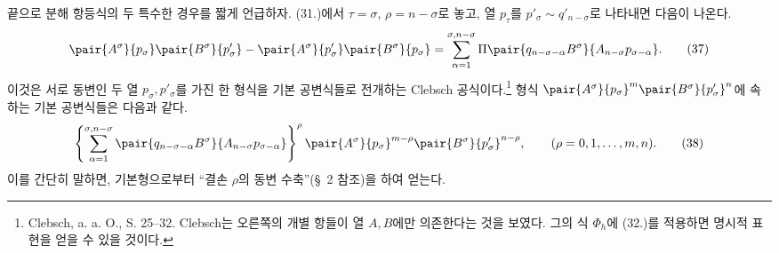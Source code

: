 
끝으로 분해 항등식의 두 특수한 경우를 짧게 언급하자. (31.)에서 $\tau=\sigma$, $\rho=n-\sigma$로 놓고, 열 $p_\tau$를 $p'_\sigma\sim q'_{n-\sigma}$로 나타내면 다음이 나온다.
\begin{equation}
\begin{aligned}
\pair{A^\sigma}{p_\sigma}\pair{B^\sigma}{p'_\sigma}
-\pair{A^\sigma}{p'_\sigma}\pair{B^\sigma}{p_\sigma}
=\sum_{\alpha=1}^{\sigma,n-\sigma}
\Pi\pair{q_{n-\sigma-\alpha}B^\sigma}{A_{n-\sigma}p_{\sigma-\alpha}}.
\end{aligned}
\tag{37}
\end{equation}
이것은 서로 동변인 두 열 $p_\sigma,p'_\sigma$를 가진 한 형식을 기본 공변식들로 전개하는 Clebsch 공식이다.\footnote{Clebsch, a. a. O., S. 25--32. Clebsch는 오른쪽의 개별 항들이 열 $A,B$에만 의존한다는 것을 보였다. 그의 식 $\Phi_h$에 (32.)를 적용하면 명시적 표현을 얻을 수 있을 것이다.} 형식 $\pair{A^\sigma}{p_\sigma}^m\pair{B^\sigma}{p'_\sigma}^n$에 속하는 기본 공변식들은 다음과 같다.
\begin{equation}
 \left\{\sum_{\alpha=1}^{\sigma,n-\sigma}
 \pair{q_{n-\sigma-\alpha}B^\sigma}{A_{n-\sigma}p_{\sigma-\alpha}}
 \right\}^{\rho}
 \pair{A^\sigma}{p_\sigma}^{m-\rho}\pair{B^\sigma}{p'_\sigma}^{n-\rho},
 \qquad (\rho=0,1,\ldots,m,n).
\tag{38}
\end{equation}
이를 간단히 말하면, 기본형으로부터 ``결손 $\rho$의 동변 수축''(\S\ 2 참조)을 하여 얻는다.
